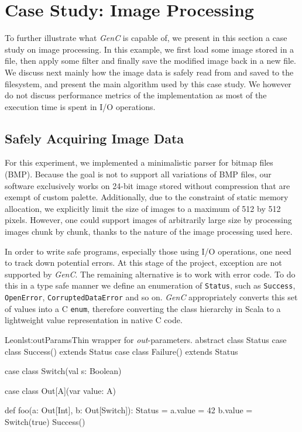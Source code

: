 \documentclass[a4paper,twoside]{article}
\newcommand{\InlineC}[1]{\lstinline[language=C99]|#1|}
\newcommand{\InlineS}[1]{\lstinline[language=Leon]|#1|}
\let\oldsection\section
\renewcommand\section{\cleardoublepage\oldsection}
\newcommand{\GenC}{\emph{GenC}\xspace}
\begin{document}
\section{Case Study: Image Processing}
\label{img_proc}

To further illustrate what \GenC is capable of, we present in this section a
case study on image processing. In this example, we first load some image stored
in a file, then apply some filter and finally save the modified image back in a
new file. We discuss next mainly how the image data is safely read from and
saved to the filesystem, and present the main algorithm used by this case study.
We however do not discuss performance metrics of the implementation as most of
the execution time is spent in I/O operations.

\subsection{Safely Acquiring Image Data}

For this experiment, we implemented a minimalistic parser for bitmap files
(BMP). Because the goal is not to support all variations of BMP files, our
software exclusively works on 24-bit image stored without compression that are
exempt of custom palette. Additionally, due to the constraint of static memory
allocation, we explicitly limit the size of images to a maximum of 512 by 512
pixels. However, one could support images of arbitrarily large size by
processing images chunk by chunk, thanks to the nature of the image processing
used here.

In order to write safe programs, especially those using I/O operations, one need
to track down potential errors. At this stage of the project, exception are not
supported by \GenC. The remaining alternative is to work with error code. To do
this in a type safe manner we define an enumeration of \InlineS{Status}, such as
\InlineS{Success}, \InlineS{OpenError}, \InlineS{CorruptedDataError} and so on.
\GenC appropriately converts this set of values into a C \InlineC{enum},
therefore converting the class hierarchy in Scala to a lightweight value
representation in native C code.

\begin{Code}{Leon}{lst:outParams}{Thin wrapper for \emph{out}-parameters.}
abstract class Status
case class Success() extends Status
case class Failure() extends Status

case class Switch(val s: Boolean)

case class Out[A](var value: A)

def foo(a: Out[Int], b: Out[Switch]): Status = {
  a.value = 42
  b.value = Switch(true)
  Success()
}
\end{Code}
\end{document}
